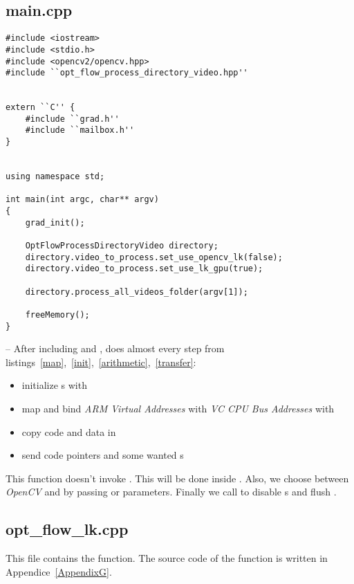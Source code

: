\subsection{main.cpp}

\begin{lstlisting}
#include <iostream>
#include <stdio.h>
#include <opencv2/opencv.hpp>
#include ``opt_flow_process_directory_video.hpp''


extern ``C'' {
	#include ``grad.h''
	#include ``mailbox.h''
}


using namespace std;

int main(int argc, char** argv)
{
	grad_init();

	OptFlowProcessDirectoryVideo directory;
	directory.video_to_process.set_use_opencv_lk(false);
	directory.video_to_process.set_use_lk_gpu(true);

	directory.process_all_videos_folder(argv[1]);

	freeMemory();
}
\end{lstlisting}

-- After including  and ,  does almost every step from listings~\ref{map},~\ref{init},~\ref{arithmetic},~\ref{transfer}:
\begin{itemize}
	\item initialize \qpu{}s with 
	\item map \ram{} and bind \emph{ARM Virtual Addresses} with \emph{VC CPU Bus Addresses} with 
	\item copy code and data in \ram
	\item send code pointers and some wanted \uni{}s
\end{itemize}

This function doesn't invoke . This will be done inside . Also, we choose between \emph{OpenCV} and \api{} by passing  or  parameters. Finally we call  to disable \qpu{}s and flush \ram.


\subsection{opt\_flow\_lk.cpp}

This file contains the  function. The source code of the function is written in Appendice~\ref{AppendixG}.

